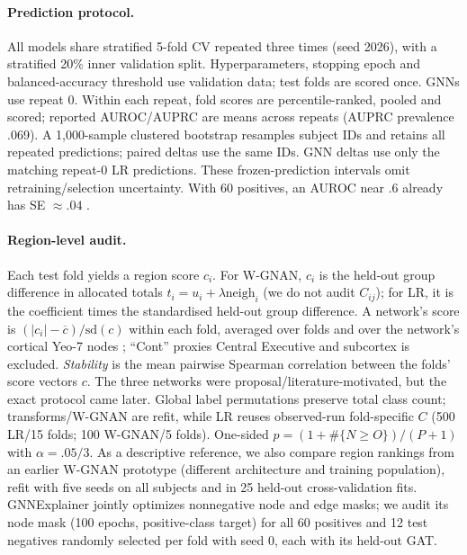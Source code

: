 \paragraph{Prediction protocol.}
All models share stratified 5-fold CV repeated three times (seed 2026), with a stratified 20\% inner
validation split. Hyperparameters, stopping epoch and balanced-accuracy threshold use validation data;
test folds are scored once. GNNs use repeat 0. Within each repeat, fold scores are percentile-ranked,
pooled and scored; reported AUROC/AUPRC are means across repeats (AUPRC prevalence .069). A
1,000-sample clustered bootstrap resamples subject IDs and retains all repeated predictions; paired
deltas use the same IDs. GNN deltas use only the matching repeat-0 LR predictions. These
frozen-prediction intervals omit retraining/selection uncertainty. With 60 positives, an AUROC near
.6 already has SE $\approx.04$ \citep{varoquaux2018cvfailure}.

\paragraph{Region-level audit.}
Each test fold yields a region score $c_i$. For W-GNAN, $c_i$ is the held-out group difference in
allocated totals $t_i=u_i+\lambda\mathrm{neigh}_i$ (we do not audit $C_{ij}$); for LR, it is the
coefficient times the standardised held-out group difference. A network's score is
$(|c_i|-\overline c)/\mathrm{sd}(c)$ within each fold, averaged over folds and over the network's
cortical Yeo-7 nodes \citep{yeo2011networks}; ``Cont'' proxies Central Executive and subcortex is
excluded. \emph{Stability} is the mean pairwise Spearman correlation between the folds' score
vectors $c$. The three
networks were proposal/literature-motivated, but the exact protocol came later. Global label
permutations preserve total class count; transforms/W-GNAN are refit, while LR reuses observed-run
fold-specific $C$ (500 LR/15 folds; 100 W-GNAN/5 folds). One-sided
$p=(1+\#\{N\geq O\})/(P+1)$ with $\alpha=.05/3$. As a descriptive reference, we also compare region rankings from an earlier W-GNAN prototype
(different architecture and training population), refit with five seeds on all subjects and in
25 held-out cross-validation fits. GNNExplainer jointly optimizes nonnegative
node and edge masks; we audit its node mask (100 epochs, positive-class target) for all 60 positives
and 12 test negatives randomly selected per fold with seed 0, each with its held-out GAT.
